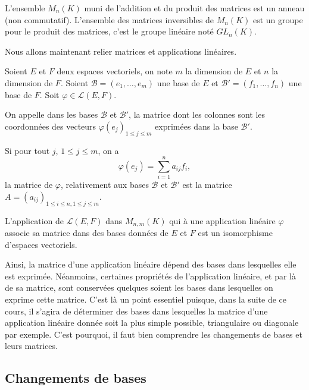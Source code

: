 \documentclass[class=report,crop=false]{standalone}
\begin{document}
\begin{proposition}
L'ensemble $M_n(K)$ muni de l'addition et du produit des matrices est un anneau (non commutatif). 
L'ensemble des matrices inversibles de $M_n(K)$ est un groupe pour le produit des matrices, 
c'est le groupe linéaire noté $GL_n(K)$.
\end{proposition} 


Nous allons maintenant relier matrices et applications linéaires.

Soient $E$ et $F$ deux espaces vectoriels, on note $m$ la dimension de $E$ et $n$ la dimension de $F$. Soient $\mathcal{B}=(e_1,\dots,e_m)$ une base de $E$ et $\mathcal{B}'=(f_1,\dots,f_n)$ une base de $F$. Soit $\varphi\in \mathcal{L}(E,F)$.

\begin{definition}
On appelle  dans les 
bases $\mathcal{B}$ et $\mathcal{B}'$, la matrice dont les colonnes 
sont les coordonnées des vecteurs $\varphi(e_j)_{1\leq j\leq m}$ exprimées 
dans la base $\mathcal{B}'$.
\end{definition}


Si pour tout $j$, $1\leq j\leq m$, on a $$\varphi(e_j)=\sum_{i=1}^n a_{ij}f_i,$$
la matrice de $\varphi$, relativement aux bases $\mathcal{B}$ et $\mathcal{B}'$ 
est la matrice $A=(a_{ij})_{1\leq i\leq n,1\leq j\leq m}$. 

\begin{proposition}
L'application de $\mathcal{L}(E,F)$ dans $M_{n,m}(K)$ qui à 
une application linéaire $\varphi$ associe sa matrice dans des bases données de $E$ et $F$ est 
un isomorphisme d'espaces vectoriels.
\end{proposition} 

Ainsi, la matrice d'une application linéaire dépend des bases dans 
lesquelles elle est exprimée. Néanmoins, certaines propriétés de 
l'application linéaire, et par là de sa matrice, sont conservées 
quelques soient les bases dans lesquelles on exprime cette matrice. 
C'est là un point essentiel puisque, dans la suite de ce cours, 
il s'agira de déterminer des bases dans lesquelles la matrice 
d'une application linéaire donnée soit la plus simple possible, 
triangulaire ou diagonale par exemple. C'est pourquoi, il faut 
bien comprendre les changements de bases et leurs matrices.


\subsection{Changements de bases}
\end{document}
